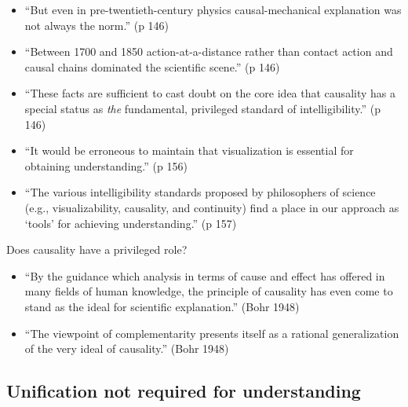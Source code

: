 \documentclass[fleqn]{beamer}
\begin{document}
\begin{frame}

  \begin{itemize}
  \item ``But even in pre-twentieth-century physics causal-mechanical
    explanation was not always the norm.'' (p 146)
  \item ``Between 1700 and 1850 action-at-a-distance rather than
    contact action and causal chains dominated the scientific scene.''
    (p 146)
  \end{itemize}

\end{frame}

\begin{frame}

  \begin{itemize}
  \item ``These facts are sufficient to cast doubt on the core idea
    that causality has a special status as \emph{the} fundamental,
    privileged standard of intelligibility.'' (p 146)
  \item ``It would be erroneous to maintain that visualization is
    essential for obtaining understanding.'' (p 156)
  \item ``The various intelligibility standards proposed by
    philosophers of science (e.g., visualizability, causality, and
    continuity) find a place in our approach as `tools' for achieving
    understanding.'' (p 157)
  \end{itemize}

\end{frame}

\begin{frame}{Does causality have a privileged role?}

  \begin{itemize}
  \item ``By the guidance which analysis in terms of cause and effect
    has offered in many fields of human knowledge, the principle of
    causality has even come to stand as the ideal for scientific
    explanation.'' (Bohr 1948)
  \item ``The viewpoint of complementarity presents itself as a
    rational generalization of the very ideal of causality.'' (Bohr 1948)
  \end{itemize}

\end{frame}

\subsection{Unification not required for understanding}
\end{document}
